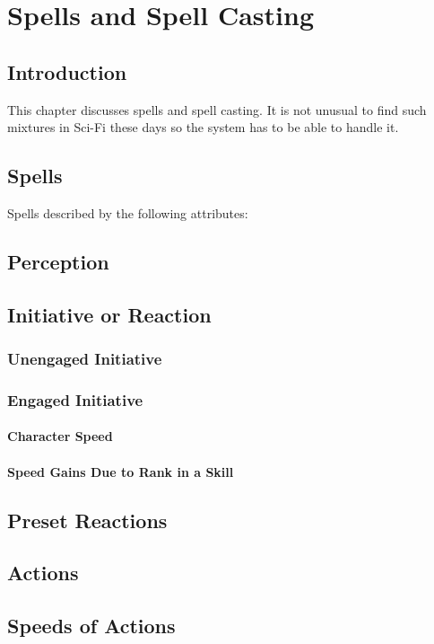 \chapter{Spells and Spell Casting}

\section{Introduction}

This chapter discusses spells and spell casting. It is not unusual to
find such mixtures in Sci-Fi these days so the system has to be able to
handle it.

\section{Spells}

Spells described by the following attributes:

\section{Perception}
\section{Initiative or Reaction}
\subsection{Unengaged Initiative}
\subsection{Engaged Initiative}
\subsubsection{Character Speed}
\subsubsection{Speed Gains Due to Rank in a Skill}
\section{Preset Reactions}
\section{Actions}
\section{Speeds of Actions}
